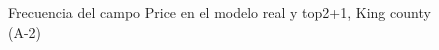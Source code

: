 \begin{figure}[H]
    \centering
    
    \caption{Frecuencia del campo Price en el modelo real y top2+1, King county (A-2)}
    \label{frecuency-top2+1-price}
\end{figure}